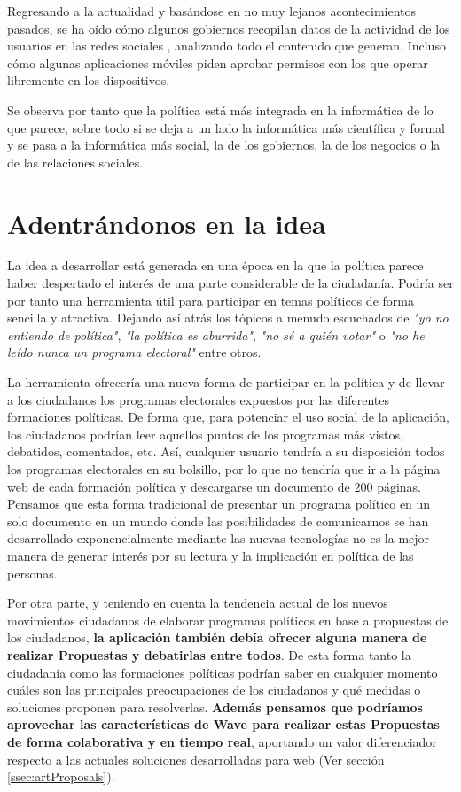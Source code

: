 Regresando a la actualidad y basándose en no muy lejanos acontecimientos pasados, se ha oído cómo algunos gobiernos recopilan datos de la actividad de los usuarios en las redes sociales \cite{ref:NSAData}, analizando todo el contenido que generan. Incluso cómo algunas aplicaciones móviles piden aprobar permisos con los que operar libremente en los dispositivos.

Se observa por tanto que la política está más integrada en la informática de lo que parece, sobre todo si se deja a un lado la informática más científica y formal y se pasa a la informática más social, la de los gobiernos, la de los negocios o la de las relaciones sociales.


\section{Adentrándonos en la idea}

La idea a desarrollar está generada en una época en la que la política parece haber despertado el interés de una parte considerable de la ciudadanía. Podría ser por tanto una herramienta útil para participar en temas políticos de forma sencilla y atractiva. Dejando así atrás los tópicos a menudo escuchados de \textit{"yo no entiendo de política"}, \textit{"la política es aburrida"}, \textit{"no sé a quién votar"} o \textit{"no he leído nunca un programa electoral"} entre otros.

La herramienta ofrecería una nueva forma de participar en la política y de llevar a los ciudadanos los programas electorales expuestos por las diferentes formaciones políticas. De forma que, para potenciar el uso social de la aplicación, los ciudadanos podrían leer aquellos puntos de los programas más vistos, debatidos, comentados, etc. Así, cualquier usuario tendría a su disposición todos los programas electorales en su bolsillo, por lo que no tendría que ir a la página web de cada formación política y descargarse un documento de 200 páginas. Pensamos que esta forma tradicional de presentar un programa político en un solo documento en un mundo donde las posibilidades de comunicarnos se han desarrollado exponencialmente mediante las nuevas tecnologías no es la mejor manera de generar interés por su lectura y la implicación en política de las personas.

Por otra parte, y teniendo en cuenta la tendencia actual de los nuevos movimientos ciudadanos de elaborar programas políticos en base a propuestas de los ciudadanos, \textbf{la aplicación también debía ofrecer alguna manera de realizar Propuestas y debatirlas entre todos}. De esta forma tanto la ciudadanía como las formaciones políticas podrían saber en cualquier momento cuáles son las principales preocupaciones de los ciudadanos y qué medidas o soluciones proponen para resolverlas. \textbf{Además pensamos que podríamos aprovechar las características de Wave para realizar estas Propuestas de forma colaborativa y en tiempo real}, aportando un valor diferenciador respecto a las actuales soluciones desarrolladas para web (Ver sección \ref{ssec:artProposals}).

